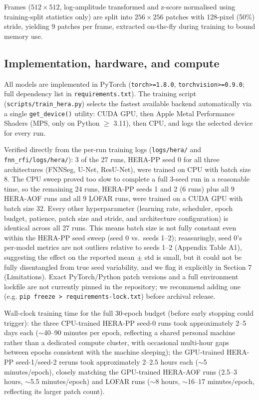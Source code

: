 \documentclass[11pt]{article}
\begin{document}
Frames ($512\times512$, log-amplitude transformed and z-score normalised using training-split statistics only) are split into $256\times256$ patches with 128-pixel (50\%) stride, yielding 9 patches per frame, extracted on-the-fly during training to bound memory use.

\subsection{Implementation, hardware, and compute}

All models are implemented in PyTorch (\texttt{torch>=1.8.0}, \texttt{torchvision>=0.9.0}; full dependency list in \texttt{requirements.txt}). The training script (\texttt{scripts/train\_hera.py}) selects the fastest available backend automatically via a single \texttt{get\_device()} utility: CUDA GPU, then Apple Metal Performance Shaders (MPS, only on Python $\geq$ 3.11), then CPU, and logs the selected device for every run.

Verified directly from the per-run training logs (\texttt{logs/hera/} and \texttt{fnn\_rfi/logs/hera/}): 3 of the 27 runs, HERA-PP seed 0 for all three architectures (FNNSeg, U-Net, ResU-Net), were trained on CPU with batch size 8. The CPU sweep proved too slow to complete a full 3-seed run in a reasonable time, so the remaining 24 runs, HERA-PP seeds 1 and 2 (6 runs) plus all 9 HERA-AOF runs and all 9 LOFAR runs, were trained on a CUDA GPU with batch size 32. Every other hyperparameter (learning rate, scheduler, epoch budget, patience, patch size and stride, and architecture configuration) is identical across all 27 runs. This means batch size is not fully constant even within the HERA-PP seed sweep (seed 0 vs.\ seeds 1--2); reassuringly, seed 0's per-model metrics are not outliers relative to seeds 1--2 (Appendix Table A1), suggesting the effect on the reported mean $\pm$ std is small, but it could not be fully disentangled from true seed variability, and we flag it explicitly in Section 7 (Limitations). Exact PyTorch/Python patch versions and a full environment lockfile are not currently pinned in the repository; we recommend adding one (e.g. \texttt{pip freeze > requirements-lock.txt}) before archival release.

Wall-clock training time for the full 30-epoch budget (before early stopping could trigger): the three CPU-trained HERA-PP seed-0 runs took approximately 2--5 days each ($\sim$40--90 minutes per epoch, reflecting a shared personal machine rather than a dedicated compute cluster, with occasional multi-hour gaps between epochs consistent with the machine sleeping); the GPU-trained HERA-PP seed-1/seed-2 reruns took approximately 2--2.5 hours each ($\sim$5 minutes/epoch), closely matching the GPU-trained HERA-AOF runs (2.5--3 hours, $\sim$5.5 minutes/epoch) and LOFAR runs ($\sim$8 hours, $\sim$16--17 minutes/epoch, reflecting its larger patch count).
\end{document}
